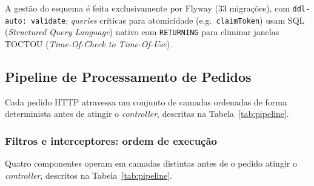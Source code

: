 A gestão do esquema é feita exclusivamente por Flyway (33 migrações), com \texttt{ddl-auto: validate}; \textit{queries} críticas para atomicidade (e.g.\ \texttt{claimToken}) usam SQL (\textit{Structured Query Language}) nativo com \texttt{RETURNING} para eliminar janelas TOCTOU (\textit{Time-Of-Check to Time-Of-Use}).

\subsection{Pipeline de Processamento de Pedidos} \label{sec:pipeline}

Cada pedido HTTP atravessa um conjunto de camadas ordenadas de forma determinista antes de atingir o \textit{controller}, descritas na Tabela~\ref{tab:pipeline}.

\subsubsection*{Filtros e interceptores: ordem de execução}

Quatro componentes operam em camadas distintas antes de o pedido atingir o \textit{controller}, descritos na Tabela~\ref{tab:pipeline}.

\begin{table}[h!]
\centering
\caption{Componentes do pipeline HTTP e responsabilidades}
\label{tab:pipeline}
\end{table}

